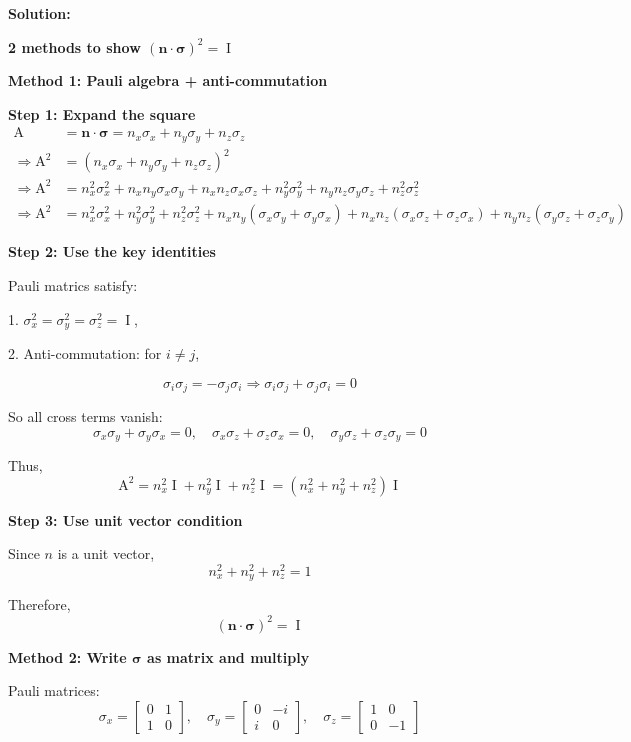 \documentclass[11pt]{article}
\newenvironment{solution}
{\par\noindent\textbf{Solution:}\par}
{\vspace{1em}}
\begin{document}
\begin{solution}

\textbf{2 methods to show $(\boldsymbol{n} \cdot \boldsymbol{\sigma})^2 = \operatorname{I}$}

\textbf{Method 1: Pauli algebra + anti-commutation}

\textbf{Step 1: Expand the square}
\[\begin{aligned}
\operatorname{A} &= \boldsymbol{n} \cdot \boldsymbol{\sigma} = n_x \sigma_x + n_y \sigma_y + n_z \sigma_z \\
\Rightarrow \operatorname{A^2} &= (n_x \sigma_x + n_y \sigma_y + n_z \sigma_z)^2 \\
\Rightarrow \operatorname{A^2} &= n_x^2 \sigma_x^2 + n_x n_y \sigma_x \sigma_y + n_x n_z \sigma_x \sigma_z + n_y^2 \sigma_y^2 + n_y n_z \sigma_y \sigma_z + n_z^2 \sigma_z^2 \\
\Rightarrow \operatorname{A^2} &= n_x^2 \sigma_x^2 + n_y^2 \sigma_y^2 + n_z^2 \sigma_z^2 + n_x n_y (\sigma_x \sigma_y + \sigma_y \sigma_x) + n_x n_z (\sigma_x \sigma_z + \sigma_z \sigma_x) + n_y n_z (\sigma_y \sigma_z + \sigma_z \sigma_y)
\end{aligned}\]

\textbf{Step 2: Use the key identities}

Pauli matrics satisfy:

1. $\sigma_x^2 = \sigma_y^2 = \sigma_z^2 = \operatorname{I}$,

2. Anti-commutation: for $i \neq j$,

\[\sigma_i \sigma_j = - \sigma_j \sigma_i \Rightarrow \sigma_i \sigma_j + \sigma_j \sigma_i = 0\]

So all cross terms vanish:
\[\sigma_x \sigma_y + \sigma_y \sigma_x = 0, \quad \sigma_x \sigma_z + \sigma_z \sigma_x = 0, \quad \sigma_y \sigma_z + \sigma_z \sigma_y = 0\]

Thus, \[\operatorname{A^2} = n_x^2 \operatorname{I} + n_y^2 \operatorname{I} + n_z^2 \operatorname{I} = (n_x^2 + n_y^2 + n_z^2) \operatorname{I}\]

\textbf{Step 3: Use unit vector condition}

Since $n$ is a unit vector, \[n_x^2 + n_y^2 + n_z^2 = 1\]

Therefore, \[\boxed{(\boldsymbol{n} \cdot \boldsymbol{\sigma})^2 = \operatorname{I}}\]


\textbf{Method 2: Write $\boldsymbol{\sigma}$ as matrix and multiply}

Pauli matrices: \[\sigma_x = \begin{bmatrix}0 & 1 \\ 1 & 0\end{bmatrix}, \quad \sigma_y = \begin{bmatrix}0 & -i \\ i & 0\end{bmatrix}, \quad \sigma_z = \begin{bmatrix}1 & 0 \\ 0 & -1\end{bmatrix}\]


\end{solution}
\end{document}
